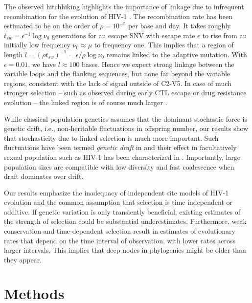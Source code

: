 \documentclass[rmp, twocolumn]{revtex4}
\newcommand{\shankaregion}{C2-V5}
\begin{document}
The observed hitchhiking highlights the importance of linkage due to
infrequent recombination for the evolution of HIV-1
\citep{neher_recombination_2010, batorsky_estimate_2011,
josefsson_majority_2011}. The recombination rate has been estimated to be on the
order of $\rho = 10^{-5}$ per base and day. It takes roughly $t_{sw} =
\epsilon^{-1} \log \nu_0$ generations for an escape SNV with escape rate
$\epsilon$ to rise from an initially low frequency $\nu_0\approx \mu$ to frequency
one. This implies that a region of length $l = (\rho t_{sw})^{-1} = \epsilon /
\rho \log \nu_0$ remains linked to the adaptive mutation. With $\epsilon=0.01$,
we have $l\approx 100$ bases. Hence we expect strong linkage between the
variable loops and the flanking sequences, but none far beyond the variable
regions, consistent with the lack of signal outside of \shankaregion. In case of
much stronger selection -- such as observed during early CTL escape or drug
resistance evolution -- the linked region is of course much larger
\citep{nijhuis_stochastic_1998}. 

While classical population genetics assumes that the dominant stochastic force
is genetic drift, i.e., non-heritable fluctuations in offspring number, our
results show that stochasticity due to linked selection is much more important.
Such fluctuations have been termed \emph{genetic draft} in
\citet{gillespie_genetic_2000} and their effect in facultatively sexual population
such as HIV-1 has been characterized in \citep{neher_genetic_2011}. Importantly,
large population sizes are compatible with low diversity and fast coalescence
when draft dominates over drift.

Our results emphasize the inadequacy of independent site models of HIV-1 evolution
and the common assumption that selection is time independent or additive. 
If genetic variation is only transiently beneficial, existing estimates of the
strength of selection \citep{neher_recombination_2010,batorsky_estimate_2011}
could be substantial underestimates. Furthermore, weak conservation and
time-dependent selection result in estimates of evolutionary 
rates that depend on the time interval of observation, with lower rates across
larger intervals. This implies that deep nodes in phylogenies might be older than 
they appear.

\section*{Methods}
\end{document}
